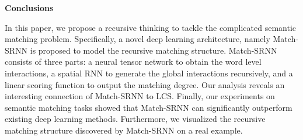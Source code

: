 \textbf{Conclusions}

In this paper, we propose a recursive thinking to tackle the complicated semantic matching problem.
Specifically, a novel deep learning architecture, namely Match-SRNN is proposed to model the recursive matching structure. Match-SRNN consists of three parts: a neural tensor network to obtain the word level interactions, a spatial RNN to generate the global interactions recursively, and a linear scoring function to output the matching degree. Our analysis reveals an interesting connection of Match-SRNN to LCS. Finally, our experiments on semantic matching tasks showed that Match-SRNN can significantly outperform existing deep learning methods. Furthermore, we visualized the recursive matching structure discovered by Match-SRNN on a real example.




